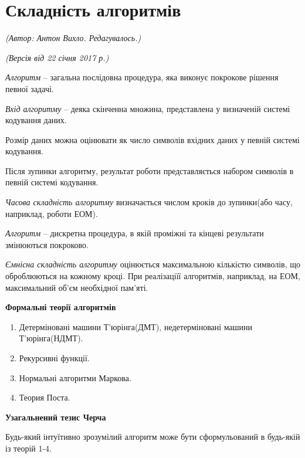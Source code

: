\section{Складність алгоритмів}
\begin{flushright}
\emph{(Автор: Антон Вихло. Редагувалось.)}
\par \emph{(Версія від 22 січня 2017 р.)}
\end{flushright}

\emph{Алгоритм} -- загальна послідовна процедура, яка виконує покрокове рішення певної задачі.

\emph{Вхід алгоритму} -- деяка скінченна множина, представлена у визначеній системі кодування даних.

Розмір даних можна оцінювати як число символів вхідних даних у певній системі кодування.

Після зупинки алгоритму, результат роботи представляється набором символів в певній системі кодування.

\emph{Часова складність алгоритму} визначається числом кроків до зупинки(або часу, наприклад, роботи ЕОМ).

\emph{Алгоритм} -- дискретна процедура, в якій проміжні та кінцеві результати змінюються покроково.

\emph{Ємнісна складність алгоритму} оцінюється максимальною кількістю символів, що оброблюються на кожному кроці. При реалізаціїї алгоритмів, наприклад, на ЕОМ, максимальний об'єм необхідної пам'яті.

\begin{center} 
\textbf{Формальні теорії алгоритмів} 
\end{center}

\begin{enumerate} 
\item Детерміновані машини Т'юрінга(ДМТ), недетерміновані машини Т'юрінга(НДМТ).
\item Рекурсивні функції.
\item Нормальні алгоритми Маркова.
\item Теория Поста.
\end{enumerate} 

\begin{center} 
\textbf{Узагальнений тезис Черча} 
\end{center}

Будь-який інтуїтивно зрозумілий алгоритм може бути сформульований в будь-якій із теорій 1-4.

